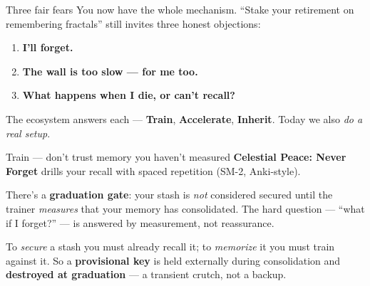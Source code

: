 \documentclass[aspectratio=169,11pt]{beamer}
\begin{document}

\begin{frame}{Three fair fears}
  You now have the whole mechanism. ``Stake your retirement on remembering
  fractals'' still invites three honest objections:
  \begin{enumerate}
    \item \textbf{I'll forget.}
    \item \textbf{The wall is too slow --- for me too.}
    \item \textbf{What happens when I die, or can't recall?}
  \end{enumerate}
  \vspace{4pt}
  \begin{center}\small
  The ecosystem answers each --- \textbf{Train}, \textbf{Accelerate},
  \textbf{Inherit}. Today we also \emph{do a real setup}.
  \end{center}
\end{frame}

\begin{frame}{Train --- don't trust memory you haven't measured}
  \textbf{Celestial Peace: Never Forget} drills your recall with spaced
  repetition (SM-2, Anki-style).
  \begin{keyidea}
    There's a \textbf{graduation gate}: your stash is \emph{not} considered
    secured until the trainer \emph{measures} that your memory has consolidated.
    The hard question --- ``what if I forget?'' --- is answered by measurement,
    not reassurance.
  \end{keyidea}
  \begin{deeper}
    To \emph{secure} a stash you must already recall it; to \emph{memorize} it you
    must train against it. So a \textbf{provisional key} is held externally during
    consolidation and \textbf{destroyed at graduation} --- a transient crutch, not
    a backup.
  \end{deeper}
\end{frame}
\end{document}
